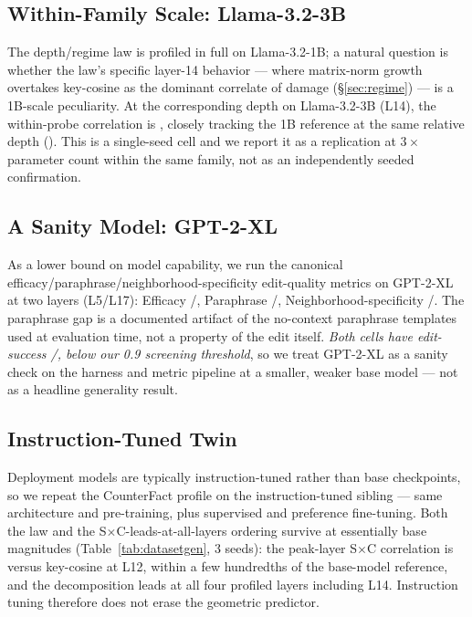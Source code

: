\subsection{Within-Family Scale: Llama-3.2-3B}
\label{sec:generality-scale}
The depth/regime law is profiled in full on Llama-3.2-1B; a natural question
is whether the law's specific layer-14 behavior --- where matrix-norm growth
overtakes key-cosine as the dominant correlate of damage
(\S\ref{sec:regime}) --- is a 1B-scale peculiarity. At the corresponding
depth on Llama-3.2-3B (L14), the within-probe correlation is
\llamaThreeBLfourteen{}, closely tracking the 1B reference at the same
relative depth (\llamaOneBLfourteenRef{}). This is a single-seed cell and we
report it as a replication at $3\times$ parameter count within the same
family, not as an independently seeded confirmation.

\subsection{A Sanity Model: GPT-2-XL}
\label{sec:generality-gpt2}
As a lower bound on model capability, we run the canonical
efficacy/paraphrase/neighborhood-specificity edit-quality metrics on
GPT-2-XL~\citep{radford2019gpt2} at two layers (L5/L17): Efficacy
\gptEsL{}/\gptEsH{}, Paraphrase \gptPsL{}/\gptPsH{}, Neighborhood-specificity
\gptNsL{}/\gptNsH{}. The paraphrase gap is a documented artifact of the
no-context paraphrase templates used at evaluation time, not a property of
the edit itself. \emph{Both cells have edit-success \gptEsrL{}/\gptEsrH{},
below our 0.9 screening threshold}, so we treat GPT-2-XL as a sanity check on
the harness and metric pipeline at a smaller, weaker base model --- not as a
headline generality result.

\subsection{Instruction-Tuned Twin}
\label{sec:generality-instruct}
Deployment models are typically instruction-tuned rather than base
checkpoints, so we repeat the CounterFact profile on the instruction-tuned
sibling --- same architecture and pre-training, plus supervised and preference
fine-tuning. Both the law and the S$\times$C-leads-at-all-layers ordering
survive at essentially base magnitudes (Table~\ref{tab:datasetgen}, 3 seeds):
the peak-layer S$\times$C correlation is
\instructSCpeak{} versus key-cosine \instructCpeak{} at L12, within a few
hundredths of the base-model reference, and the decomposition leads at all four
profiled layers including L14. Instruction tuning therefore does not erase the
geometric predictor.

